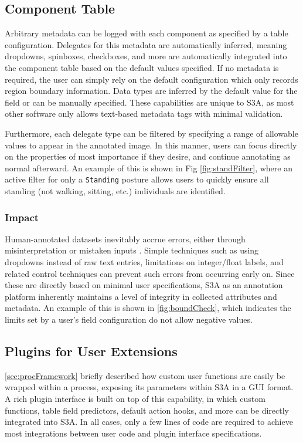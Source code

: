 \subsection{Component Table}

Arbitrary metadata can be logged with each component as specified by a table configuration. Delegates for this metadata are automatically inferred, meaning dropdowns, spinboxes, checkboxes, and more are automatically integrated into the component table based on the default values specified. If no metadata is required, the user can simply rely on the default configuration which only records region boundary information. Data types are inferred by the default value for the field or can be manually specified. These capabilities are unique to S3A, as most other software only allows text-based metadata tags with minimal validation.

Furthermore, each delegate type can be filtered by specifying a range of allowable values to appear in the annotated image. In this manner, users can focus directly on the properties of most importance if they desire, and continue annotating as normal afterward. An example of this is shown in Fig \ref{fig:standFilter}, where an active filter for only a \texttt{Standing} posture allows users to quickly ensure all standing (not walking, sitting, etc.) individuals are identified.

\makeStandFilterFig

\subsubsection{Impact}
Human-annotated datasets inevitably accrue errors, either through misinterpretation or mistaken inputs \cite{Dai_crowdSourceWorkflows,Russakovsky_humanCollabAnnotation2015}. Simple techniques such as using dropdowns instead of raw text entries, limitations on integer/float labels, and related control techniques can prevent such errors from occurring early on. Since these are directly based on minimal user specifications, S3A as an annotation platform inherently maintains a level of integrity in collected attributes and metadata. An example of this is shown in \autoref{fig:boundCheck}, which indicates the limits set by a user's field configuration do not allow negative values.

\makeBoundCheckFig

\subsection{Plugins for User Extensions}
\autoref{sec:procFramework} briefly described how custom user functions are easily be wrapped within a process, exposing its parameters within S3A in a GUI format. A rich plugin interface is built on top of this capability, in which custom functions, table field predictors, default action hooks, and more can be directly integrated into S3A. In all cases, only a few lines of code are required to achieve most integrations between user code and plugin interface specifications.

